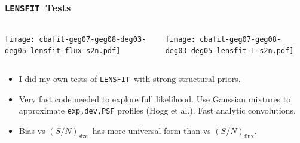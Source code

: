 \documentclass{beamer}
\newcommand{\snT}{$(S/N)_{\textrm{size}}$}
\newcommand{\snflux}{$(S/N)_{\textrm{flux}}$}
\newcommand{\lensfit}{\texttt{LENSFIT}}
\begin{document}
\frame
{
    \frametitle{\lensfit\ Tests}

    \begin{columns}
        
        \begin{column}{0.5\textwidth}
            \texttt{[image: cbafit-geg07-geg08-deg03-deg05-lensfit-flux-s2n.pdf]}
        \end{column}

        \begin{column}{0.5\textwidth}
            \texttt{[image: cbafit-geg07-geg08-deg03-deg05-lensfit-T-s2n.pdf]}
        \end{column}
    \end{columns}

    \fontsize{8}{0.8\baselineskip}
    \begin{itemize}

        \item I did my own tests of \lensfit\ with strong structural priors.

        \item Very fast code needed to explore full likelihood.  Use Gaussian
            mixtures to approximate \texttt{exp,dev,PSF} profiles (Hogg et al.).
            Fast analytic convolutions.

        \item Bias vs \snT\ has more universal form than vs \snflux.
    \end{itemize}

}

\end{document}
